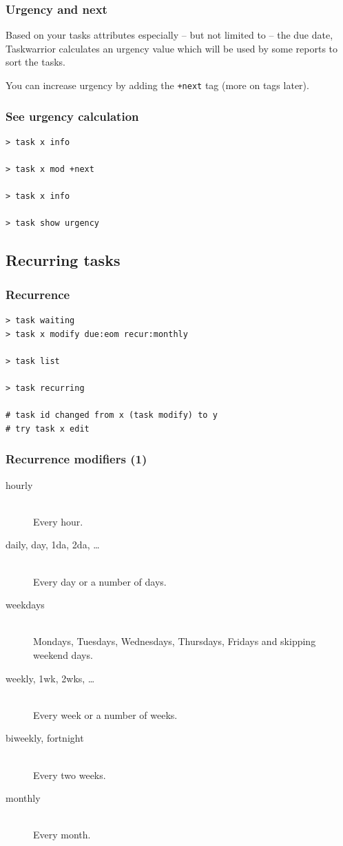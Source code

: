 \documentclass[t,handout,aspectratio=169]{beamer}
\begin{document}
\begin{frame}[fragile]\frametitle{Urgency and next}
    \vfill
    Based on your tasks attributes especially -- but not limited to -- the due date, Taskwarrior calculates an urgency value which will be used by some reports to sort the tasks. \pause

    You can increase urgency by adding the \verb=+next= tag (more on tags later).
\end{frame}

\begin{frame}[fragile]\frametitle{See urgency calculation}
    \vfill
    \begin{lstlisting}
> task x info

> task x mod +next

> task x info

> task show urgency\end{lstlisting}
\end{frame}

\subsection{Recurring tasks}

\begin{frame}[fragile]\frametitle{Recurrence}
    \vfill
    \begin{lstlisting}
> task waiting
> task x modify due:eom recur:monthly

> task list

> task recurring

# task id changed from x (task modify) to y
# try task x edit\end{lstlisting}
\end{frame}

\begin{frame}[fragile]\frametitle{Recurrence modifiers (1)}
    \vfill
    \begin{description}
        \item[hourly] \hfill \\
            Every hour.
        \item[daily, day, 1da, 2da, \ldots] \hfill \\
            Every day or a number of days.
        \item[weekdays] \hfill \\
            Mondays, Tuesdays, Wednesdays, Thursdays, Fridays and skipping weekend days.
        \item[weekly, 1wk, 2wks, \ldots] \hfill \\
            Every week or a number of weeks.
        \item[biweekly, fortnight] \hfill \\
            Every two weeks.
        \item[monthly] \hfill \\
            Every month.
    \end{description}
\end{frame}
\end{document}
